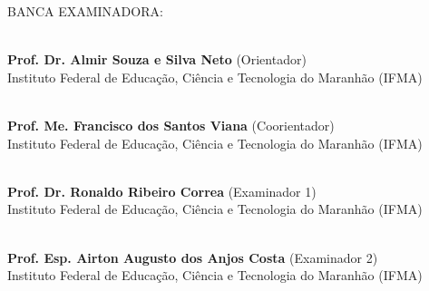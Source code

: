\begin{folhadeaprovacao}
    \vspace*{0.5cm}

    \begin{center}
        {\selectfont BANCA EXAMINADORA:}
    \end{center}
    
    \vspace*{1cm}
    
    \begin{center}
        \underline{\hspace{12cm}} \\
        \textbf{Prof. Dr. Almir Souza e Silva Neto} (Orientador) \\
        Instituto Federal de Educação, Ciência e Tecnologia do Maranhão (IFMA)
        
        \vspace*{1cm}
        
        \underline{\hspace{12cm}} \\
        \textbf{Prof. Me. Francisco dos Santos Viana} (Coorientador) \\
        Instituto Federal de Educação, Ciência e Tecnologia do Maranhão (IFMA)
        
        \vspace*{1cm}
        
        \underline{\hspace{12cm}} \\
        \textbf{Prof. Dr. Ronaldo Ribeiro Correa} (Examinador 1) \\
        Instituto Federal de Educação, Ciência e Tecnologia do Maranhão (IFMA)
        
        \vspace*{1cm}
        
        \underline{\hspace{12cm}} \\
        \textbf{Prof. Esp. Airton Augusto dos Anjos Costa} (Examinador 2)\\
        Instituto Federal de Educação, Ciência e Tecnologia do Maranhão (IFMA)
    \end{center}
    
    

    
\end{folhadeaprovacao}


